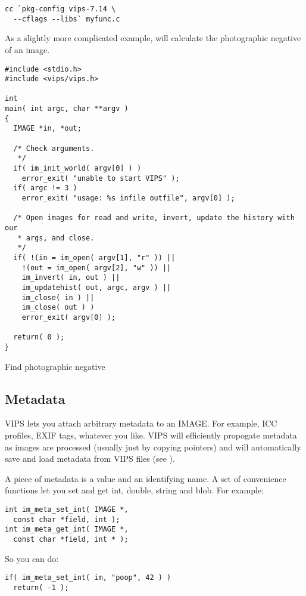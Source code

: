 \begin{verbatim}
cc `pkg-config vips-7.14 \
  --cflags --libs` myfunc.c 
\end{verbatim}

As a slightly more complicated example, 
will calculate the photographic negative of an image.

\begin{fig2}
\begin{verbatim}
#include <stdio.h>
#include <vips/vips.h>

int
main( int argc, char **argv )
{
  IMAGE *in, *out;

  /* Check arguments.
   */
  if( im_init_world( argv[0] ) )
    error_exit( "unable to start VIPS" );
  if( argc != 3 )
    error_exit( "usage: %s infile outfile", argv[0] );

  /* Open images for read and write, invert, update the history with our
   * args, and close.
   */
  if( !(in = im_open( argv[1], "r" )) ||
    !(out = im_open( argv[2], "w" )) ||
    im_invert( in, out ) ||
    im_updatehist( out, argc, argv ) ||
    im_close( in ) || 
    im_close( out ) )
    error_exit( argv[0] );
  
  return( 0 );
}
\end{verbatim}
\label{fg:negative}
\caption{Find photographic negative}
\end{fig2}

\subsection{Metadata}
\label{sec:meta}

VIPS lets you attach arbitrary metadata to an IMAGE. For example, ICC
profiles, EXIF tags, whatever you like. VIPS will efficiently propogate
metadata as images are processed (usually just by copying pointers) and will
automatically save and load metadata from VIPS files (see
).

A piece of metadata is a value and an identifying name. A set of
convenience functions let you set and get int, double, string and blob. For
example:

\begin{verbatim}
int im_meta_set_int( IMAGE *,
  const char *field, int );
int im_meta_get_int( IMAGE *,
  const char *field, int * );
\end{verbatim}

So you can do:

\begin{verbatim}
if( im_meta_set_int( im, "poop", 42 ) )
  return( -1 );
\end{verbatim}

